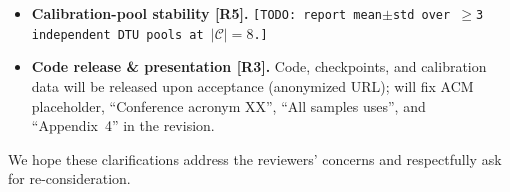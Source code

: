 \documentclass[9pt]{article}
\begin{document}
\begin{itemize}
\item \textbf{Calibration-pool stability [R5].} \texttt{[TODO: report mean$\pm$std over $\geq$3 independent DTU pools at $|\mathcal{C}|{=}8$.]}

\item \textbf{Code release \& presentation [R3].} Code, checkpoints, and calibration data will be released upon acceptance (anonymized URL); will fix ACM placeholder, ``Conference acronym XX'', ``All samples uses'', and ``Appendix~4'' in the revision.
\end{itemize}

\smallskip
\noindent We hope these clarifications address the reviewers' concerns and respectfully ask for re-consideration.
\end{document}

